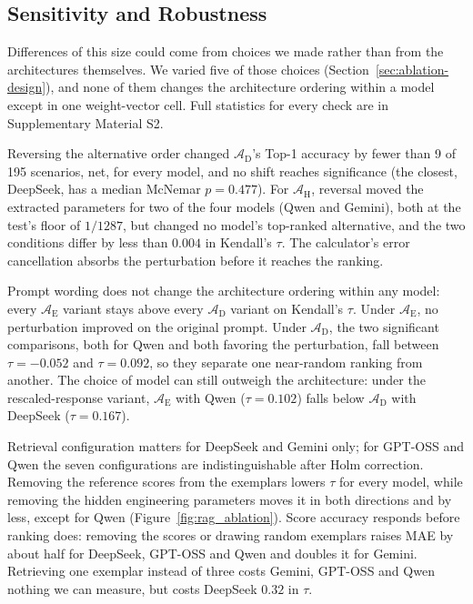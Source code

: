 \documentclass[final,3p,times]{elsarticle}
\begin{document}
\FloatBarrier
\subsection{Sensitivity and Robustness}
\label{sec:res-sensitivity}
Differences of this size could come from choices we made rather than from the architectures themselves. We varied five of those choices (Section~\ref{sec:ablation-design}), and none of them changes the architecture ordering within a model except in one weight-vector cell. Full statistics for every check are in Supplementary Material S2.

Reversing the alternative order changed $\mathcal{A}_{\text{D}}$'s Top-1 accuracy by fewer than 9 of 195 scenarios, net, for every model, and no shift reaches significance (the closest, DeepSeek, has a median McNemar $p = 0.477$). For $\mathcal{A}_{\text{H}}$, reversal moved the extracted parameters for two of the four models (Qwen and Gemini), both at the test's floor of $1/1287$, but changed no model's top-ranked alternative, and the two conditions differ by less than $0.004$ in Kendall's $\tau$. The calculator's error cancellation absorbs the perturbation before it reaches the ranking.

Prompt wording does not change the architecture ordering within any model: every $\mathcal{A}_{\text{E}}$ variant stays above every $\mathcal{A}_{\text{D}}$ variant on Kendall's $\tau$. Under $\mathcal{A}_{\text{E}}$, no perturbation improved on the original prompt. Under $\mathcal{A}_{\text{D}}$, the two significant comparisons, both for Qwen and both favoring the perturbation, fall between $\tau = -0.052$ and $\tau = 0.092$, so they separate one near-random ranking from another. The choice of model can still outweigh the architecture: under the rescaled-response variant, $\mathcal{A}_{\text{E}}$ with Qwen ($\tau = 0.102$) falls below $\mathcal{A}_{\text{D}}$ with DeepSeek ($\tau = 0.167$).

Retrieval configuration matters for DeepSeek and Gemini only; for GPT-OSS and Qwen the seven configurations are indistinguishable after Holm correction. Removing the reference scores from the exemplars lowers $\tau$ for every model, while removing the hidden engineering parameters moves it in both directions and by less, except for Qwen (Figure~\ref{fig:rag_ablation}). Score accuracy responds before ranking does: removing the scores or drawing random exemplars raises MAE by about half for DeepSeek, GPT-OSS and Qwen and doubles it for Gemini. Retrieving one exemplar instead of three costs Gemini, GPT-OSS and Qwen nothing we can measure, but costs DeepSeek $0.32$ in $\tau$.
\end{document}
